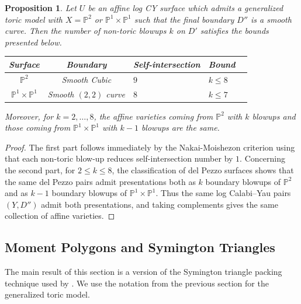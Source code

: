 \documentclass[11pt, reqno]{amsart}
\newtheorem{proposition}[theorem]{Proposition}
\theoremstyle{definition}
\begin{document}
\begin{proposition}
Let $U$ be an affine log CY surface which admits a generalized toric model with $X=\mathbb{P}^2$ or $\mathbb{P}^1\times \mathbb{P}^1$ such that the final boundary $D''$ is a smooth curve. Then the number of non-toric blowups $k$ on $D'$ satisfies the  bounds presented below.

\begin{table}[htbp]
\centering
\renewcommand{\arraystretch}{1.8}
\begin{tabular}{@{}ccllc@{}}
\toprule
\textbf{Surface} &  \textbf{Boundary} & \textbf{Self-intersection} & \textbf{Bound} \\
\midrule
$\mathbb{P}^2$ &Smooth Cubic & $9$ & $\displaystyle k \le 8$ \\
$\mathbb{P}^1\times \mathbb{P}^1$& Smooth $(2,2)$ curve & $8$ & $\displaystyle k \le 7$ \\
\bottomrule
\end{tabular}

\label{tab:smooth_bounds}
\end{table}

Moreover, for $k=2,\ldots, 8$, the affine varieties coming from $\mathbb{P}^2$ with $k$ blowups and those coming from $\mathbb{P}^1\times \mathbb{P}^1$ with $k-1$ blowups are the same. 
\end{proposition}

\begin{proof}
The first part follows immediately by the Nakai-Moishezon criterion using that each non-toric blow-up reduces self-intersection number by $1.$ Concerning the second part, for \(2\leq k\leq 8\), the classification of del Pezzo surfaces shows that the
same del Pezzo pairs admit presentations both as \(k\) boundary blowups of
\(\mathbb{P}^2\) and as \(k-1\) boundary blowups of
\(\mathbb{P}^1\times\mathbb{P}^1\). Thus the same log Calabi--Yau pairs \((Y,D'')\) admit both
presentations, and taking complements gives the same collection of
affine varieties.
\end{proof}




\subsection{Moment Polygons and Symington Triangles}


The main result of this section is a version of the Symington triangle packing technique used by \cite{EF21, LMN23, LMN25}. We use the notation from the previous section for the generalized toric model. 
\end{document}
